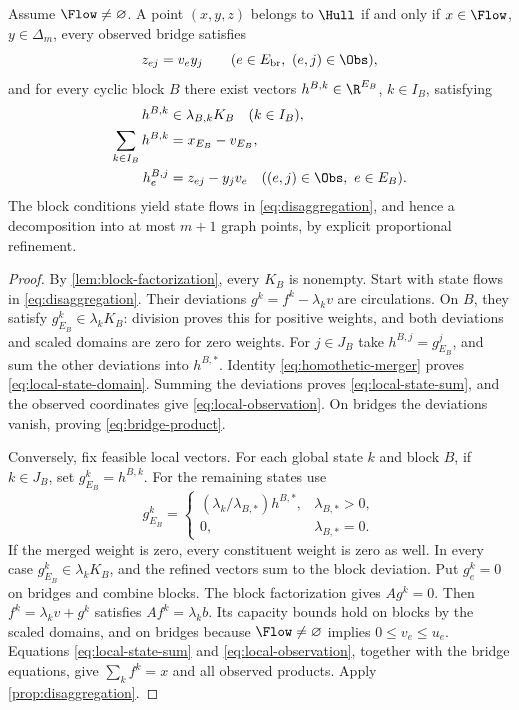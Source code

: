\begin{theorem}\label{thm:block-state-reduction}
Assume $\Flow\ne\varnothing$. A point $(x,y,z)$ belongs to $\Hull$ if and
only if $x\in\Flow$, $y\in\Delta_m$, every observed bridge satisfies
\begin{equation}\label{eq:bridge-product}
 z_{ej}=v_e y_j\qquad(e\in E_{\rm br},\ (e,j)\in\Obs),
\end{equation}
and for every cyclic block $B$ there exist vectors
$h^{B,k}\in\R^{E_B}$, $k\in I_B$, satisfying
\begin{align}
 h^{B,k}&\in\lambda_{B,k}K_B\quad(k\in I_B),\label{eq:local-state-domain}\\
 \sum_{k\in I_B}h^{B,k}&=x_{E_B}-v_{E_B},\label{eq:local-state-sum}\\
 h^{B,j}_e&=z_{ej}-y_jv_e
       \quad((e,j)\in\Obs,\ e\in E_B).\label{eq:local-observation}
\end{align}
The block conditions yield state flows in
\eqref{eq:disaggregation}, and hence a decomposition into at most $m+1$
graph points, by explicit proportional refinement.
\end{theorem}
\begin{proof}
By \cref{lem:block-factorization}, every $K_B$ is nonempty. Start with
state flows in \eqref{eq:disaggregation}. Their deviations
$g^k=f^k-\lambda_k v$ are circulations. On $B$, they satisfy
$g^k_{E_B}\in\lambda_kK_B$: division proves this for positive weights,
and both deviations and scaled domains are zero for zero weights.
For $j\in J_B$ take $h^{B,j}=g^j_{E_B}$, and sum the other deviations
into $h^{B,*}$. Identity \eqref{eq:homothetic-merger} proves
\eqref{eq:local-state-domain}. Summing the deviations proves
\eqref{eq:local-state-sum}, and the observed coordinates give
\eqref{eq:local-observation}. On bridges the deviations vanish, proving
\eqref{eq:bridge-product}.

Conversely, fix feasible local vectors. For each global state $k$ and block
$B$, if $k\in J_B$, set $g^k_{E_B}=h^{B,k}$. For the remaining states use
\begin{equation}\label{eq:proportional-refinement}
 g^k_{E_B}=\begin{cases}
 (\lambda_k/\lambda_{B,*})h^{B,*},&\lambda_{B,*}>0,\\
 0,&\lambda_{B,*}=0.
 \end{cases}
\end{equation}
If the merged weight is zero, every constituent weight is zero as well.
In every case $g^k_{E_B}\in\lambda_kK_B$, and the refined vectors sum to
the block deviation. Put $g^k_e=0$ on bridges and combine blocks. The block
factorization gives $Ag^k=0$. Then $f^k=\lambda_kv+g^k$ satisfies
$Af^k=\lambda_kb$. Its capacity bounds hold on blocks by the scaled
domains, and on bridges because $\Flow\ne\varnothing$ implies
$0\le v_e\le u_e$. Equations \eqref{eq:local-state-sum} and
\eqref{eq:local-observation}, together with the bridge equations, give
$\sum_kf^k=x$ and all observed products. Apply
\cref{prop:disaggregation}.
\end{proof}

